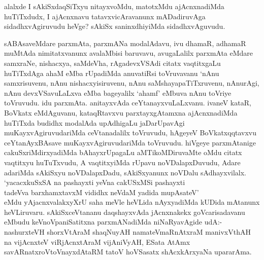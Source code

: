 \begin{artha}
alalxde I sAkiSxdaqSiTxyu nitayxvoMdu, matotxMdu ajAcnxnadiMda huTiTxdudx, I ajAcnxnavu tatavxvicAravanunx mADadiruvAga sidadhxvAgiruvudu heVge? sAkiSx saninxdhiyiMda sidadhxvAguvudu. 
\end{artha}

\begin{artha}
sABAsaveMdare parxmAta, parxmANa modalAdavu, ivu dhamaR, adhamaR muMtAda nimitatxvanunx avalaMbisi baruvavu, avugaLalilx parxmAta eMdare samxraNe, nishacxya, saMdeVha, rAgadevxVSAdi citatx vaqtitxgaLu huTiTxdAga ahaM eMba rUpadiMda anuvatiRsi toVruvavanu `nAnu samxrisuvenu, nAnu nishacxyisiruvenu, nAnu saMshayapaTiTxruvenu, nAnurAgi, nAnu devxVSavuLaLxva eMba bageyalilx `ahamf' eMbuva nAnu toVriye toVruvudu. idu parxmAta. anitayxvAda ceYtanayxvuLaLxvanu. ivaneV kataR, BoVkatx eMdAguvanu, kataqRtavxvu parxtayxgAtamxna ajAcnxnadiMda huTiTxda budidhx modalAda upAdhigaLu jaDarUpavAgi muKayxvAgiruvudariMda ceVtanadalilx toVruvudu, hAgeyeV BoVkatxqqtavxvu ceYtanAyxBAsave muKayxvAgiruvudariMda toVruvudu. hiVgeye parxmAtanige cakuSxriMdirxyadiMda bAhayxrUpagaLu aMTikoMDiruvaMte oMdu citatx vaqtitxyu huTuTxvudu, A vaqtitxyiMda rUpavu noVDalapxDuvudu, Adare adariMda sAkiSxyu noVDalapxDadu, sAkiSxyanunx noVDalu sAdhayxvilalx.\\ `yacacxkuSxSA na pashayxti yeVna cakUSxMSi pashayxti\\tadeVva barxhamxtavxM vididhx neVdaM yadida mupAsateV'\\ eMdu yAjacnxvalakxyXrU saha meVle heVLida nAyxyadiMda kUDida mAtanunx heVLiruvaru. sAkiSxceVtananu daqshayxvAda jAcnxnakekx goVcarisadavanu eMbudu keVnoVpaniSatitxna parxmANadiMda niNaRyavAgide \mdash  udA:- nashurxteVH shorxVtAraM shaqNuyAH namateVmaRnAtxraM manivxVthAH na vijAcnxteV viRjAcnxtAraM vijAniVyAH, ESata AtAmx savARnatxroV\s toV\s nayxdAtaRM tatoV hoVSasatx shAcxkArxyaNa upararAma.
\end{artha}


